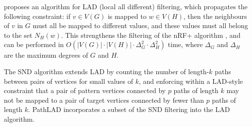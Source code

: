 
\citet{DBLP:journals/ai/Solnon10} proposes an algorithm for LAD (local all
different) filtering, which propagates the following constraint: if $v \in
V(G)$ is mapped to $w \in V(H)$, then the neighbours of $v$ in $G$ must all be
mapped to different values, and these values must all belong to the set
$N_H(w)$.  This strengthens the filtering of the nRF+ algorithm
\citep{DBLP:journals/mscs/LarrosaV02}, and can be performed in $O(|V(G)| \cdot
|V(H)| \cdot \Delta_G^2 \cdot \Delta_H^2)$ time, where $\Delta_G$ and
$\Delta_H$ are the maximum degrees of $G$ and $H$.

The SND algorithm \citep{DBLP:conf/cp/AudemardLMGP14} extends LAD by counting
the number of length-$k$ paths between pairs of vertices for small values of
$k$, and enforcing within a LAD-style constraint that a pair of pattern
vertices connected by $p$ paths of length $k$ may not be mapped to a pair of
target vertices connected by fewer than $p$ paths of length $k$.  PathLAD
\citep{DBLP:conf/lion/KotthoffMS16} incorporates a subset of the SND filtering
into the LAD algorithm.


